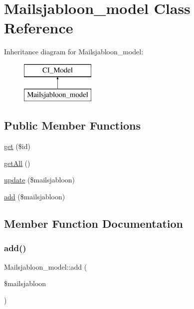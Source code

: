 \hypertarget{class_mailsjabloon__model}{}\section{Mailsjabloon\+\_\+model Class Reference}
\label{class_mailsjabloon__model}
Inheritance diagram for Mailsjabloon\+\_\+model\+:\begin{figure}[H]
\begin{center}
\leavevmode
\includegraphics[height=2.000000cm]{class_mailsjabloon__model}
\end{center}
\end{figure}
\subsection*{Public Member Functions}
\begin{DoxyCompactItemize}
\item 
\mbox{\hyperlink{class_mailsjabloon__model_a2fd2620c0951e3b9954e557652b74ff0}{get}} (\$id)
\item 
\mbox{\hyperlink{class_mailsjabloon__model_a6723ec4f9fa1a3f1195f93f0c9326239}{get\+All}} ()
\item 
\mbox{\hyperlink{class_mailsjabloon__model_a4272406d2eee5775d951d5320d0618aa}{update}} (\$mailsjabloon)
\item 
\mbox{\hyperlink{class_mailsjabloon__model_ac8906f2f6b9aedabd697ab35ce11e407}{add}} (\$mailsjabloon)
\end{DoxyCompactItemize}


\subsection{Member Function Documentation}
\mbox{\label{class_mailsjabloon__model_ac8906f2f6b9aedabd697ab35ce11e407}} 
\subsubsection{\texorpdfstring{add()}{add()}}
{\footnotesize\ttfamily Mailsjabloon\+\_\+model\+::add (\begin{DoxyParamCaption}\item[{}]{\$mailsjabloon }\end{DoxyParamCaption})}

